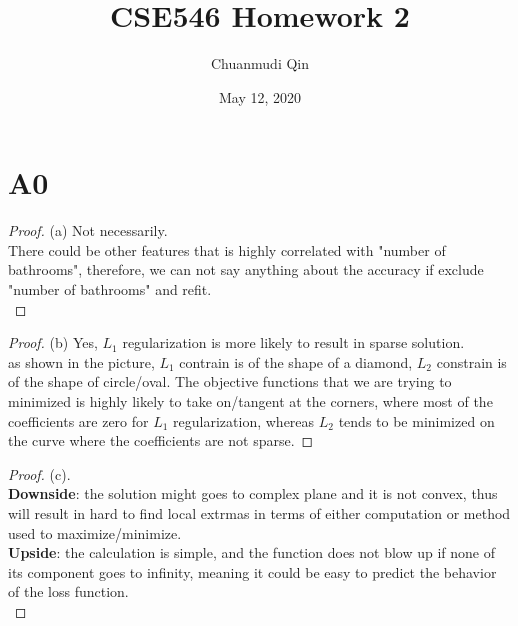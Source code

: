 \documentclass[12pt]{article}
\title{\vspace{-7.5ex}\textbf{\Large CSE546 Homework 2}\vspace{-1.7ex}}
\author{Chuanmudi Qin}
\date{\vspace{-1ex}May 12, 2020\vspace{-5ex}}
\begin{document}
\maketitle
\section*{A0}
\begin{proof}
        (a) Not necessarily. \\
There could be other features that is highly correlated with "number of bathrooms", therefore, we can not say anything about the accuracy if exclude "number of bathrooms" and refit.\\
\end{proof}

\begin{proof}
        (b) Yes, $L_1$ regularization is more likely to result in sparse solution.\\as shown in the picture, $L_1$ contrain is of the shape of a diamond, $L_2$ constrain is of the shape of circle/oval. The objective functions that we are trying to minimized is highly likely to take on/tangent at the corners, where most of the coefficients are zero for $L_1$ regularization, whereas $L_2$ tends to be minimized on the curve where the coefficients are not sparse.

\end{proof}

\begin{proof}
        (c).\\
        \textbf{Downside}: the solution might goes to complex plane and it is not convex, thus will result in hard to find local extrmas in terms of either computation or method used to maximize/minimize.\\
        \textbf{Upside}: the calculation is simple, and the function does not blow up if none of its component goes to infinity, meaning it could be easy to predict the behavior of the loss function. \\
\end{proof}
\end{document}
